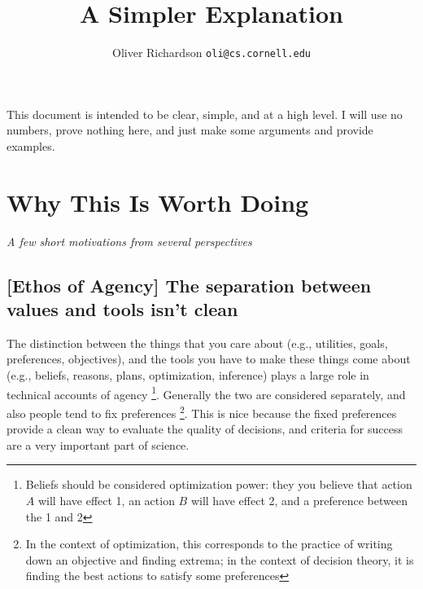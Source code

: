 \documentclass{article}
\title{A Simpler Explanation}
\author{Oliver Richardson  \texttt{oli@cs.cornell.edu}}
\begin{document}
	This document is intended to be clear, simple, and at a high level. %
	I will use no numbers, prove nothing here, and just make some arguments and provide examples.
	

	\section{Why This Is Worth Doing}
	\vspace{-1em}
	\textit{A few short motivations from several perspectives}
	\subsection*{[Ethos of Agency] The separation between values and tools isn't clean}
	The distinction between the things that you care about (e.g., utilities, goals, preferences, objectives), and the tools you have to make these things come about (e.g., beliefs, reasons, plans, optimization, inference) plays a large role in technical accounts of agency%
	\footnote{Beliefs should be considered optimization power: they you believe that action $A$ will have effect 1, an action $B$ will have effect 2, and a preference between the 1 and 2}. Generally the two are considered separately, and also people tend to fix preferences%
	\footnote{In the context of optimization, this corresponds to the practice of writing down an objective and finding extrema; in the context of decision theory, it is finding the best actions to satisfy some preferences}. This is nice because the fixed preferences provide a clean way to evaluate the quality of decisions, and criteria for success are a very important part of science.
	
\end{document}
